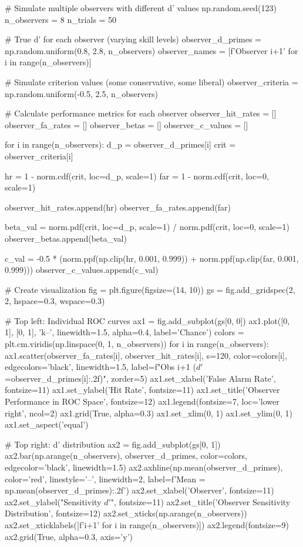 \documentclass[11pt,a4paper]{article}
\begin{document}
\begin{pycode}
# Simulate multiple observers with different d' values
np.random.seed(123)
n_observers = 8
n_trials = 50

# True d' for each observer (varying skill levels)
observer_d_primes = np.random.uniform(0.8, 2.8, n_observers)
observer_names = [f'Observer {i+1}' for i in range(n_observers)]

# Simulate criterion values (some conservative, some liberal)
observer_criteria = np.random.uniform(-0.5, 2.5, n_observers)

# Calculate performance metrics for each observer
observer_hit_rates = []
observer_fa_rates = []
observer_betas = []
observer_c_values = []

for i in range(n_observers):
    d_p = observer_d_primes[i]
    crit = observer_criteria[i]

    hr = 1 - norm.cdf(crit, loc=d_p, scale=1)
    far = 1 - norm.cdf(crit, loc=0, scale=1)

    observer_hit_rates.append(hr)
    observer_fa_rates.append(far)

    beta_val = norm.pdf(crit, loc=d_p, scale=1) / norm.pdf(crit, loc=0, scale=1)
    observer_betas.append(beta_val)

    c_val = -0.5 * (norm.ppf(np.clip(hr, 0.001, 0.999)) + norm.ppf(np.clip(far, 0.001, 0.999)))
    observer_c_values.append(c_val)

# Create visualization
fig = plt.figure(figsize=(14, 10))
gs = fig.add_gridspec(2, 2, hspace=0.3, wspace=0.3)

# Top left: Individual ROC curves
ax1 = fig.add_subplot(gs[0, 0])
ax1.plot([0, 1], [0, 1], 'k--', linewidth=1.5, alpha=0.4, label='Chance')
colors = plt.cm.viridis(np.linspace(0, 1, n_observers))
for i in range(n_observers):
    ax1.scatter(observer_fa_rates[i], observer_hit_rates[i], s=120, color=colors[i],
                edgecolors='black', linewidth=1.5, label=f"Obs {i+1} ($d'$={observer_d_primes[i]:.2f})", zorder=5)
ax1.set_xlabel('False Alarm Rate', fontsize=11)
ax1.set_ylabel('Hit Rate', fontsize=11)
ax1.set_title('Observer Performance in ROC Space', fontsize=12)
ax1.legend(fontsize=7, loc='lower right', ncol=2)
ax1.grid(True, alpha=0.3)
ax1.set_xlim(0, 1)
ax1.set_ylim(0, 1)
ax1.set_aspect('equal')

# Top right: d' distribution
ax2 = fig.add_subplot(gs[0, 1])
ax2.bar(np.arange(n_observers), observer_d_primes, color=colors, edgecolor='black', linewidth=1.5)
ax2.axhline(np.mean(observer_d_primes), color='red', linestyle='--', linewidth=2, label=f'Mean = {np.mean(observer_d_primes):.2f}')
ax2.set_xlabel('Observer', fontsize=11)
ax2.set_ylabel("Sensitivity $d'$", fontsize=11)
ax2.set_title('Observer Sensitivity Distribution', fontsize=12)
ax2.set_xticks(np.arange(n_observers))
ax2.set_xticklabels([f'{i+1}' for i in range(n_observers)])
ax2.legend(fontsize=9)
ax2.grid(True, alpha=0.3, axis='y')


\end{pycode}
\end{document}
